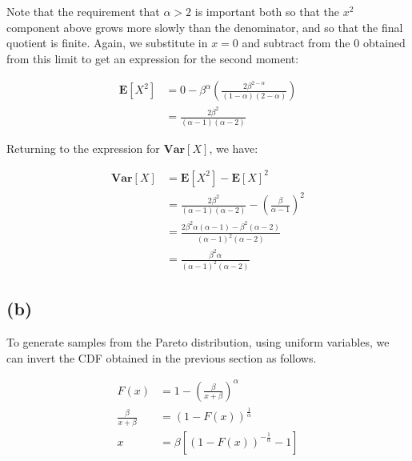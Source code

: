 \documentclass{article}
\begin{document}
Note that the requirement that $\alpha > 2$ is important both so that
the $x^2$ component above grows more slowly than the denominator, and
so that the final quotient is finite. Again, we substitute in $x = 0$
and subtract from the $0$ obtained from this limit to get an
expression for the second moment:

\begin{align*}
  \mathbf{E}\left[X^2\right] &= 0 - \beta^{\alpha} \left(
                               \frac{2 \beta^{2 - \alpha}}
                               {(1 - \alpha)(2 - \alpha)}
                               \right) \\
                             &= \frac{2 \beta^2}
                               {(\alpha - 1)(\alpha - 2)}
\end{align*}

Returning to the expression for $\mathbf{Var}\left[ X \right]$, we have:

\begin{align*}
  \mathbf{Var}\left[ X \right] &= \mathbf{E}\left[X^2\right]
                                 - {\mathbf{E}\left[X\right]}^2 \\
                               &= \frac{2 \beta^2}
                                 {(\alpha - 1)(\alpha - 2)}
                                 - {\left(
                                 \frac{\beta}{\alpha - 1}
                                 \right)}^2 \\
                               &= \frac{2 \beta^2 \alpha (\alpha - 1)
                                 - \beta^2 (\alpha - 2)}
                                 {{(\alpha - 1)}^2(\alpha - 2)} \\
                               &= \frac{\beta^2 \alpha}
                                 {{(\alpha - 1)}^2(\alpha - 2)}
\end{align*}

\subsection*{(b)}

To generate samples from the Pareto distribution, using uniform
variables, we can invert the CDF obtained in the previous section as
follows.

\begin{align*}
  F(x) &= 1 - {\left( \frac{\beta}{x + \beta} \right)}^\alpha \\
  \frac{\beta}{x + \beta} &= {\left( 1 - F(x) \right)}^{\frac{1}{\alpha}} \\
                        x &= \beta \left[{ \left( 1 - F(x)
                            \right)}^{-\frac{1}{\alpha}} - 1 \right]
\end{align*}
\end{document}
